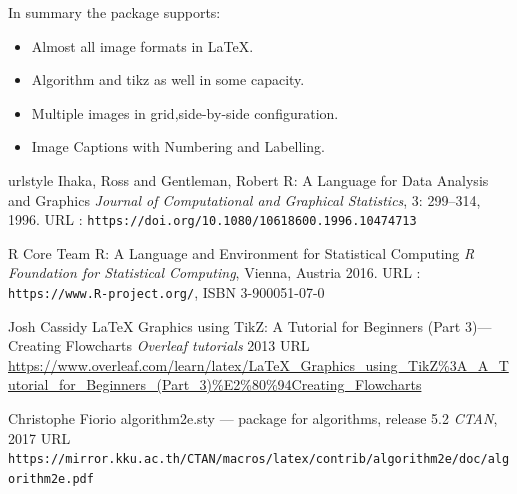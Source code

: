 In summary the  package supports:
\begin{itemize}
\item Almost all image formats in LaTeX.
\item Algorithm and tikz as well in some capacity.
\item Multiple images in grid,side-by-side configuration.
\item Image Captions with Numbering and Labelling.
\end{itemize}

\begin{thebibliography}{20}
    \providecommand{\natexlab}[1]{#1}
    \providecommand{\url}[1]{\texttt{#1}}
    \expandafter\ifx\csname urlstyle\endcsname\relax
      \providecommand{\doi}[1]{doi: #1}\else
      \providecommand{\doi}{doi: \begingroup \urlstyle{rm}\Url}\fi
{}
Ihaka, Ross and Gentleman, Robert
\newblock R: A Language for Data Analysis and Graphics
\newblock \emph{Journal of Computational and Graphical Statistics}, 3:
299--314, 1996.
\newblock URL : \url{https://doi.org/10.1080/10618600.1996.10474713}

R Core Team
\newblock R: A Language and Environment for Statistical Computing
\newblock \emph{R Foundation for Statistical Computing}, Vienna, Austria  2016.
\newblock URL : \url{https://www.R-project.org/}, ISBN 3-900051-07-0

Josh Cassidy
\newblock LaTeX Graphics using TikZ: A Tutorial for Beginners (Part 3)—Creating Flowcharts
\newblock \emph{Overleaf tutorials} 2013
\newblock URL \url{https://www.overleaf.com/learn/latex/LaTeX_Graphics_using_TikZ%3A_A_Tutorial_for_Beginners_(Part_3)%E2%80%94Creating_Flowcharts}

Christophe Fiorio
\newblock algorithm2e.sty — package for algorithms, release 5.2
\newblock \emph{CTAN}, 2017
\newblock URL \url{https://mirror.kku.ac.th/CTAN/macros/latex/contrib/algorithm2e/doc/algorithm2e.pdf}
\end{thebibliography}

\address{%
Abhishek Ulayil\\
Student, Institute of Actuaries of India\\%
Mumbai, India\\
ORCiD: 0009-0000-6935-8690\\
}
